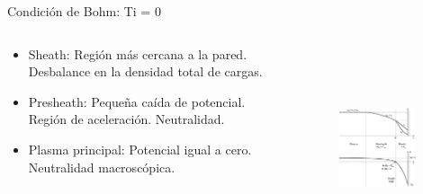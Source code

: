 \documentclass[11pt]{beamer}
\begin{document}
        \begin{frame}[t]{Condici\'on de Bohm: Ti = 0}
        
        \fontsize{9pt}{11}\selectfont
        \begin{columns}
        \begin{column}{0.4\textwidth}
        \begin{block}{}
        \begin{itemize}
            \item Sheath: Región más cercana a la pared. Desbalance en la densidad total de cargas.
            \vspace{2em}
            \item Presheath: Pequeña caída de potencial. Región de aceleración. Neutralidad.
            \vspace{2em}
            \item Plasma principal: Potencial igual a cero. Neutralidad macrosc\'opica.
        \end{itemize}
        \end{block}
        \end{column}
        
        \begin{column}{0.5\textwidth}
        \begin{figure}
        \centering
         \includegraphics[width=0.9\textwidth,height=6cm]{grafica_bohm_curvas.jpg}
        \end{figure}
        \end{column}
        
        \end{columns}
            
        \end{frame}
    
\end{document}
